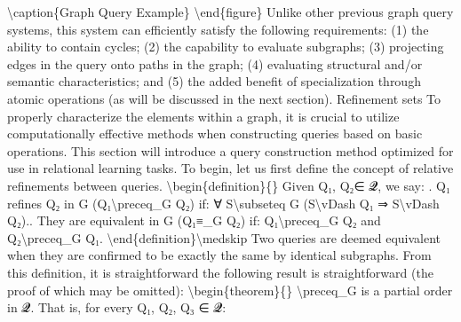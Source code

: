 \documentclass{article}%
\begin{document}
\textbackslash{}caption\{Graph Query Example\}\newline%
\textbackslash{}end\{figure\}\newline%
\newline%
Unlike other previous graph query systems, this system can efficiently satisfy the following requirements: (1) the ability to contain cycles; (2) the capability to evaluate subgraphs; (3) projecting edges in the query onto paths in the graph; (4) evaluating structural and/or semantic characteristics; and (5) the added benefit of specialization through atomic operations (as will be discussed in the next section).\newline%
\newline%
Refinement sets\newline%
\newline%
To properly characterize the elements within a graph, it is crucial to utilize computationally effective methods when constructing queries based on basic operations. This section will introduce a query construction method optimized for use in relational learning tasks. To begin, let us first define the concept of relative refinements between queries.\newline%
\newline%
\textbackslash{}begin\{definition\}\{\}\newline%
Given Q₁, Q₂∈ 𝓠, we say:\newline%
. Q₁ refines Q₂ in G (Q₁\textbackslash{}preceq\_G Q₂) if:\newline%
∀ S\textbackslash{}subseteq G (S\textbackslash{}vDash Q₁ ⇒ S\textbackslash{}vDash Q₂).. They are equivalent in G (Q₁≡\_G Q₂) if:\newline%
Q₁\textbackslash{}preceq\_G Q₂ and Q₂\textbackslash{}preceq\_G Q₁.\newline%
\textbackslash{}end\{definition\}\textbackslash{}medskip\newline%
\newline%
Two queries are deemed equivalent when they are confirmed to be exactly the same by identical subgraphs. From this definition, it is straightforward the following result is straightforward (the proof of which may be omitted):\newline%
\newline%
\textbackslash{}begin\{theorem\}\{\}\newline%
\textbackslash{}preceq\_G is a partial order in 𝓠. That is, for every Q₁, Q₂, Q₃ ∈ 𝓠:\newline%
\end{document}
